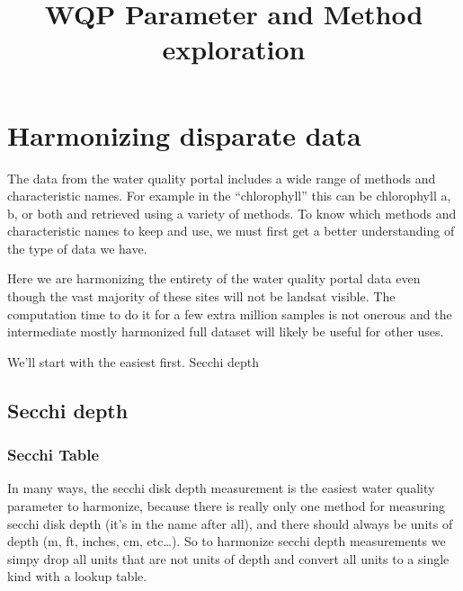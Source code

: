 \documentclass[]{article}
\title{WQP Parameter and Method exploration}
\author{}
\date{}
\newenvironment{Shaded}{\begin{snugshade}}{\end{snugshade}}
\newcommand{\CommentTok}[1]{\textcolor[rgb]{0.56,0.35,0.01}{\textit{#1}}}
\newcommand{\KeywordTok}[1]{\textcolor[rgb]{0.13,0.29,0.53}{\textbf{#1}}}
\newcommand{\NormalTok}[1]{#1}
\newcommand{\OperatorTok}[1]{\textcolor[rgb]{0.81,0.36,0.00}{\textbf{#1}}}
\newcommand{\StringTok}[1]{\textcolor[rgb]{0.31,0.60,0.02}{#1}}
\begin{document}
\maketitle

\hypertarget{harmonizing-disparate-data}{%
\section{Harmonizing disparate data}\label{harmonizing-disparate-data}}

The data from the water quality portal includes a wide range of methods
and characteristic names. For example in the ``chlorophyll'' this can be
chlorophyll a, b, or both and retrieved using a variety of methods. To
know which methods and characteristic names to keep and use, we must
first get a better understanding of the type of data we have.

Here we are harmonizing the entirety of the water quality portal data
even though the vast majority of these sites will not be landsat
visible. The computation time to do it for a few extra million samples
is not onerous and the intermediate mostly harmonized full dataset will
likely be useful for other uses.

We'll start with the easiest first. Secchi depth

\hypertarget{secchi-depth}{%
\subsection{Secchi depth}\label{secchi-depth}}

\hypertarget{secchi-table}{%
\subsubsection{Secchi Table}\label{secchi-table}}

In many ways, the secchi disk depth measurement is the easiest water
quality parameter to harmonize, because there is really only one method
for measuring secchi disk depth (it's in the name after all), and there
should always be units of depth (m, ft, inches, cm, etc\ldots{}). So to
harmonize secchi depth measurements we simpy drop all units that are not
units of depth and convert all units to a single kind with a lookup
table.

\begin{Shaded}
\end{Shaded}
\end{document}
